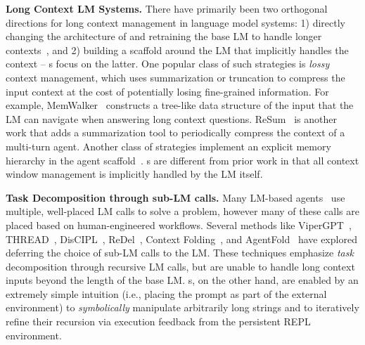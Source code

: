\textbf{Long Context LM Systems.} There have primarily been two orthogonal directions for long context management in language model systems: 1) directly changing the architecture of and retraining the base LM to handle longer contexts~\citep{press2022trainshorttestlong, gu2022efficientlymodelinglongsequences, munkhdalai2024leavecontextbehindefficient}, and 2) building a scaffold around the LM that implicitly handles the context -- \RLM{}s focus on the latter. One popular class of such strategies is \textit{lossy} context management, which uses summarization or truncation to compress the input context at the cost of potentially losing fine-grained information. For example, MemWalker~\citep{chen2023walkingmemorymazecontext} constructs a tree-like data structure of the input that the LM can navigate when answering long context questions. ReSum~\citep{wu2025resumunlockinglonghorizonsearch} is another work that adds a summarization tool to periodically compress the context of a multi-turn agent. Another class of strategies implement an explicit memory hierarchy in the agent scaffold~\citep{packer2024memgptllmsoperatingsystems, chhikara2025mem0buildingproductionreadyai,zhang2025gmemorytracinghierarchicalmemory}. \RLM{}s are different from prior work in that all context window management is implicitly handled by the LM itself. 


\textbf{Task Decomposition through sub-LM calls.} Many LM-based agents~\citep{guo2024largelanguagemodelbased, anthropic_claude_code_subagents} use multiple, well-placed LM calls to solve a problem, however many of these calls are placed based on human-engineered workflows. Several methods like ViperGPT~\cite{suris2023vipergpt}, THREAD~\citep{schroeder2025threadthinkingdeeperrecursive}, DisCIPL~\citep{grand2025self}, ReDel~\cite{zhu2024redel}, Context Folding~\citep{sun2025scalinglonghorizonllmagent}, and AgentFold~\citep{ye2025agentfoldlonghorizonwebagents} have explored deferring the choice of sub-LM calls to the LM. These techniques emphasize \textit{task} decomposition through recursive LM calls, but are unable to handle long context inputs beyond the length of the base LM. \RLM{}s, on the other hand, are enabled by an extremely simple intuition (i.e., placing the prompt as part of the external environment) to \textit{symbolically} manipulate arbitrarily long strings and to iteratively refine their recursion via execution feedback from the persistent REPL environment.





